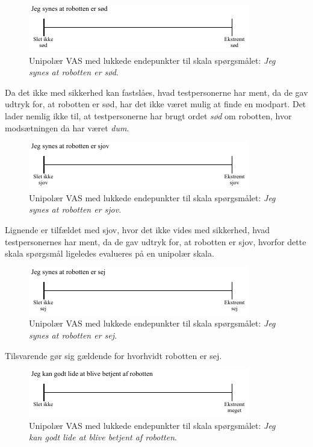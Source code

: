 %
\begin{figure}[H]
\centering
\includegraphics[width =\textwidth]{Figure/UdvalgteSkalaer/SoedR} 
\caption{Unipolær VAS med lukkede endepunkter til skala spørgsmålet: \textit{Jeg synes at robotten er sød}.}
\label{fig:SkalaSoedR}
\end{figure}
\noindent
%
Da det ikke med sikkerhed kan fastslåes, hvad testpersonerne har ment, da de gav udtryk for, at robotten er sød, har det ikke været mulig at finde en modpart. Det lader nemlig ikke til, at testpersonerne har brugt ordet \textit{sød} om robotten, hvor modsætningen da har været \textit{dum}.   
%
\begin{figure}[H]
\centering
\includegraphics[width =\textwidth]{Figure/UdvalgteSkalaer/SjovR} 
\caption{Unipolær VAS med lukkede endepunkter til skala spørgsmålet: \textit{Jeg synes at robotten er sjov}.}
\label{fig:SkalaSjovR}
\end{figure}
\noindent
%
Lignende er tilfældet med sjov, hvor det ikke vides med sikkerhed, hvad testpersonernes har ment, da de gav udtryk for, at robotten er sjov, hvorfor dette skala spørgsmål ligeledes evalueres på en unipolær skala. 
%
\begin{figure}[H]
\centering
\includegraphics[width =\textwidth]{Figure/UdvalgteSkalaer/SejR} 
\caption{Unipolær VAS med lukkede endepunkter til skala spørgsmålet: \textit{Jeg synes at robotten er sej}.}
\label{fig:SkalaSejR}
\end{figure}
\noindent
%
Tilsvarende gør sig gældende for hvorhvidt robotten er sej. 
%
\begin{figure}[H]
\centering
\includegraphics[width =\textwidth]{Figure/UdvalgteSkalaer/BetjeningAfR} 
\caption{Unipolær VAS med lukkede endepunkter til skala spørgsmålet: \textit{Jeg kan godt lide at blive betjent af robotten}.}
\label{fig:SkalaBetjeningAfR}
\end{figure}
